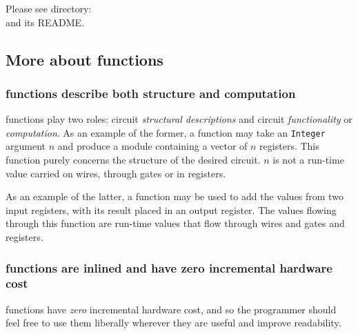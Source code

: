 \Beginexercise

Please see directory:  \\
and its README.
\Endexercise


\subsection{More about {\BSV} functions}


\subsubsection{{\BSV} functions describe both structure and computation}


{\BSV} functions play two roles: circuit \emph{structural
descriptions} and circuit \emph{functionality} or \emph{computation}.
As an example of the former, a {\BSV} function may take an
\verb|Integer| argument $n$ and produce a module containing a vector
of $n$ registers.  This function purely concerns the structure of the
desired circuit.  $n$ is not a run-time value carried on wires,
through gates or in registers.

As an example of the latter, a {\BSV} function may be used to add the
values from two input registers, with its result placed in an output
register.  The values flowing through this function are run-time
values that flow through wires and gates and registers.


\subsubsection{{\BSV} functions are inlined and have zero incremental hardware cost}


{\BSV} functions have \emph{zero} incremental hardware cost, and so
the programmer should feel free to use them liberally wherever they
are useful and improve readability.

